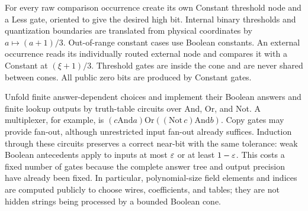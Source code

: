 For every raw comparison occurrence create its own Constant threshold
node and a Less gate, oriented to give the desired high bit. Internal
binary thresholds and quantization boundaries are translated from
physical coordinates by $a\mapsto(a+1)/3$. Out-of-range constant cases
use Boolean constants. An external occurrence reads its individually
routed external node and compares it with a Constant at $(\xi+1)/3$.
Threshold gates are inside the cone and are never shared between cones.
All public zero bits are produced by Constant gates.

Unfold finite answer-dependent choices and implement their Boolean
answers and finite lookup outputs by truth-table circuits over And, Or,
and Not. A multiplexer, for example, is
$(c\mathbin{\mathrm{And}}a)\mathbin{\mathrm{Or}}
 ((\mathrm{Not}\,c)\mathbin{\mathrm{And}}b)$.
Copy gates may provide fan-out, although unrestricted input fan-out
already suffices. Induction through these circuits preserves a correct
near-bit with the same tolerance: weak Boolean antecedents apply to
inputs at most $\varepsilon$ or at least $1-\varepsilon$. This costs a fixed number
of gates because the complete answer tree and output precision have
already been fixed. In particular, polynomial-size field elements and
indices are computed publicly to choose wires, coefficients, and tables;
they are not hidden strings being processed by a bounded Boolean cone.

